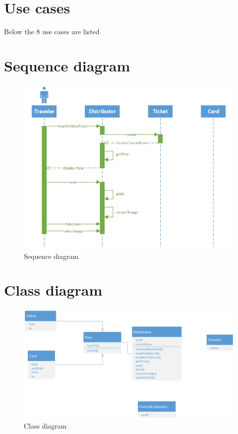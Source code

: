 \documentclass[pdftex,12pt,a4paper]{article}
\begin{document}
\section{Use cases}
Below the 8 use cases are listed


\pagebreak

\pagebreak

\pagebreak

\pagebreak

\pagebreak

\pagebreak

\pagebreak

\pagebreak

\pagebreak

\section{Sequence diagram}
\begin{figure}[h]
\centering
\includegraphics[scale = 0.8]{sequence.png}
\caption{Sequence diagram}
\end{figure}

\pagebreak

\section{Class diagram}
\begin{figure}[h]
\centering
\includegraphics[scale = 0.7]{class.png}
\caption{Class diagram}
\end{figure}
\pagebreak
\end{document}
